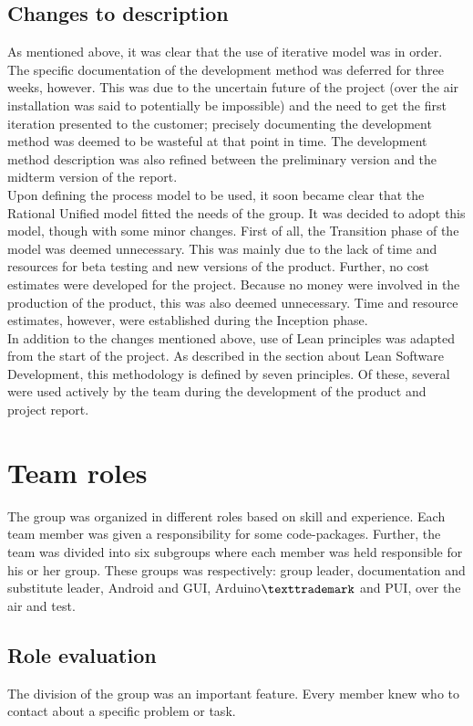 \subsection{Changes to description} 
As mentioned above, it was clear that the use of iterative model was in order. The specific documentation of the development method was deferred for three weeks, however. This was due to the uncertain future of the project (over the air installation was said to potentially be impossible) and the need to get the first iteration presented to the customer; precisely documenting the development method was deemed to be wasteful at that point in time. The development method description was also refined between the preliminary version and the midterm version of the report. \\
\newline
Upon defining the process model to be used, it soon became clear that the Rational Unified model fitted the needs of the group. It was decided to adopt this model, though with some minor changes. First of all, the Transition phase of the model was deemed unnecessary. This was mainly due to the lack of time and resources for beta testing and new versions of the product. Further, no cost estimates were developed for the project. Because no money were involved in the production of the product, this was also deemed unnecessary. Time and resource estimates, however, were established during the Inception phase. \\
\newline
In addition to the changes mentioned above, use of Lean principles was adapted from the start of the project. As described in the section about Lean Software Development, this methodology is defined by seven principles. Of these, several were used actively by the team during the development of the product and project report. %

\section{Team roles}
The group was organized in different roles based on skill and experience. Each team member was given a responsibility for some code-packages. Further, the team was divided into six subgroups where each member was held responsible for his or her group. These groups was respectively: group leader, documentation and substitute leader, Android and GUI, Arduino$\texttrademark$ and PUI, over the air and test.

\subsection{Role evaluation}
The division of the group was an important feature. Every member knew who to contact about a specific problem or task.\\

